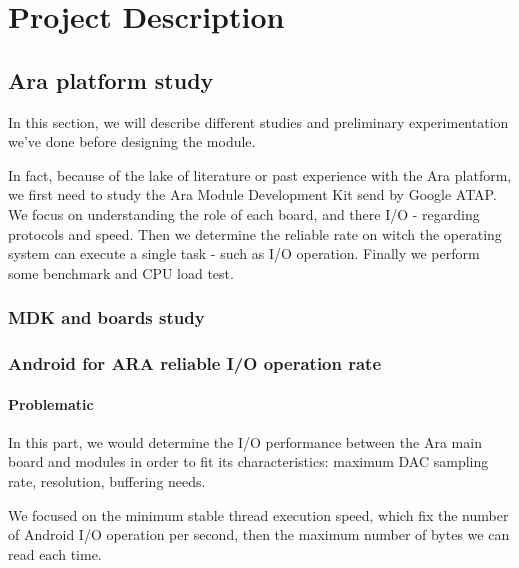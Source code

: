 
\chapter{Project Description}

\label{ProjectD}



\section{Ara platform study}

In this section, we will describe different studies and preliminary experimentation we've done before designing  the module.

In fact, because of the lake of literature or past experience with the Ara platform, we first need to study the Ara Module Development Kit send by Google ATAP. We focus on understanding the role of each board, and there I/O - regarding protocols and speed. Then we determine the reliable rate on witch the operating system can execute a single task - such as I/O operation. Finally we perform some benchmark and CPU load test. 

\subsection{MDK and boards study}



\subsection{Android for ARA reliable I/O operation rate}  \label{result-ara}


\subsubsection{Problematic}

In this part, we would determine the I/O performance between the Ara main board and  modules in order to fit its characteristics: maximum DAC sampling rate, resolution, buffering needs.

We focused on the minimum stable thread execution speed, which fix the number of Android I/O operation per second, then the maximum number of bytes we can read each time.


